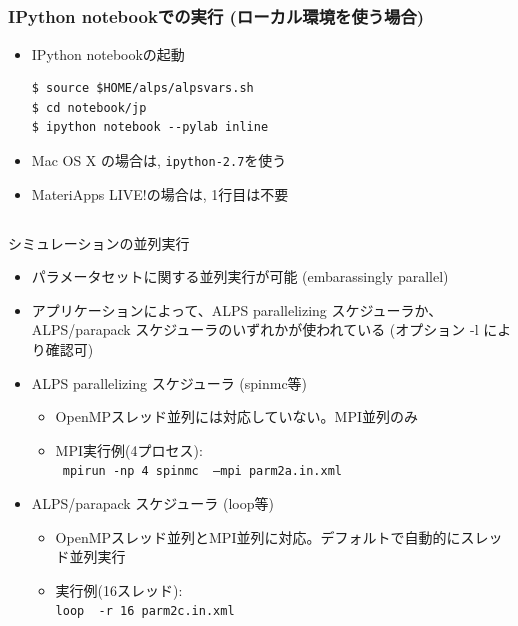 \subsection*{\redm\whitem\greenb}
\begin{frame}[t,fragile]
  \frametitle{IPython notebookでの実行 (ローカル環境を使う場合)}
  \begin{itemize}
    \setlength{\itemsep}{1em}
  \item IPython notebookの起動
\begin{lstlisting}
$ source $HOME/alps/alpsvars.sh
$ cd notebook/jp
$ ipython notebook --pylab inline
\end{lstlisting}
  \item Mac OS X の場合は, {\tt ipython-2.7}を使う
  \item MateriApps LIVE!の場合は, 1行目は不要
  \end{itemize}
\end{frame}

\subsection*{\redm\whitem\greenb}
\begin{frame}[t,fragile]{シミュレーションの並列実行}
  \begin{itemize}
    \item パラメータセットに関する並列実行が可能 (embarassingly parallel)
    \item アプリケーションによって、ALPS parallelizing スケジューラか、ALPS/parapack スケジューラのいずれかが使われている (オプション -l により確認可)
    \item ALPS parallelizing スケジューラ (spinmc等)
      \begin{itemize}
        \item OpenMPスレッド並列には対応していない。MPI並列のみ
        \item MPI実行例(4プロセス): \\ {\tt {\color{red} mpirun -np 4} spinmc {\color{red} --mpi} parm2a.in.xml}
      \end{itemize}
    \item ALPS/parapack スケジューラ (loop等)
      \begin{itemize}
        \item OpenMPスレッド並列とMPI並列に対応。デフォルトで自動的にスレッド並列実行
        \item 実行例(16スレッド): \\ {\tt loop {\color{red} -r 16} parm2c.in.xml}
      \end{itemize}
  \end{itemize}
\end{frame}

